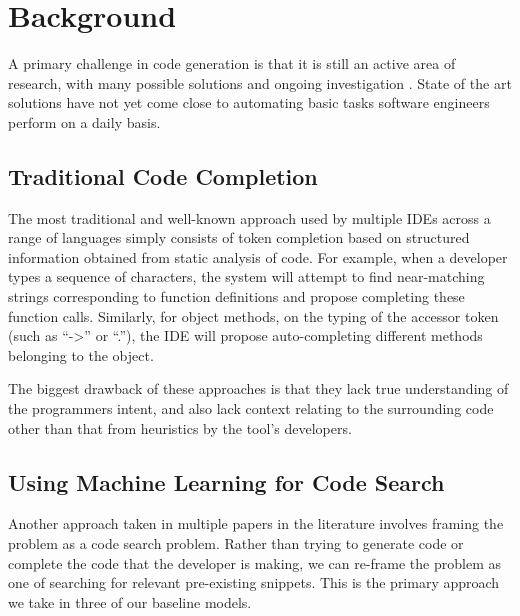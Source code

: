 \documentclass[10pt,twocolumn]{article}
\begin{document}
\section{Background}
\label{sec:background}
A primary challenge in code generation is that it is still an active area of research, with many possible solutions and ongoing investigation \cite{structural_code_modeling}. State of the art solutions have not yet come close to automating basic tasks software engineers perform on a daily basis.

\subsection{Traditional Code Completion}
The most traditional and well-known approach used by multiple IDEs across a range of languages simply consists of token completion based on structured information obtained from static analysis of code. For example, when a developer types a sequence of characters, the system will attempt to find near-matching strings corresponding to function definitions and propose completing these function calls. Similarly, for object methods, on the typing of the accessor token (such as ``->'' or ``.''), the IDE will propose auto-completing different methods belonging to the object.

The biggest drawback of these approaches is that they lack true understanding of the programmers intent, and also lack context relating to the surrounding code other than that from heuristics by the tool's developers.

\subsection{Using Machine Learning for Code Search}
Another approach taken in multiple papers in the literature \cite{codesearchnet} involves framing the problem as a code search problem. Rather than trying to generate code or complete the code that the developer is making, we can re-frame the problem as one of searching for relevant pre-existing snippets. This is the primary approach we take in three of our baseline models.
\end{document}
